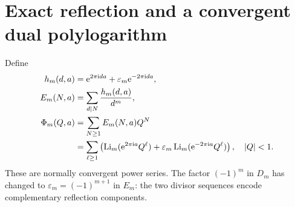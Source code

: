 \documentclass[11pt,a4paper]{article}
\numberwithin{equation}{section}
\theoremstyle{definition}\newtheorem{definition}[theorem]{Definition}
\theoremstyle{remark}\newtheorem{remark}[theorem]{Remark}
\newcommand{\ii}{\mathrm i}\newcommand{\e}{\mathrm e}
\newcommand{\eps}{\varepsilon}\newcommand{\muh}{\widehat\mu}
\begin{document}
\section{Exact reflection and a convergent dual polylogarithm}
\label{sec:reflection}

Define
\begin{align}
 h_m(d,a)&=\e^{2\pi\ii da}+\eps_m\e^{-2\pi\ii da},\notag\\
 E_m(N,a)&=\sum_{d\mid N}\frac{h_m(d,a)}{d^m},\label{eq:E}\\
 \Phi_m(Q,a)&=\sum_{N\ge1}E_m(N,a)Q^N\notag\\
 &=\sum_{\ell\ge1}\left(\Li_m(\e^{2\pi\ii a}Q^\ell)
              +\eps_m\Li_m(\e^{-2\pi\ii a}Q^\ell)\right),
       \quad |Q|<1.\label{eq:Phi}
\end{align}
These are normally convergent power series. The factor $(-1)^m$ in
$D_m$ has changed to $\eps_m=(-1)^{m+1}$ in $E_m$: the two divisor
sequences encode complementary reflection components.
\end{document}
